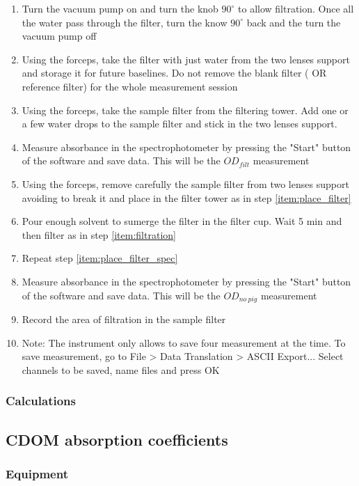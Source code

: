 \begin{appendices}
\begin{enumerate}
  \item \label{item:filtration} Turn the vacuum pump on and turn the knob $90^\circ$ to allow filtration. Once all the water pass through the filter, turn the know $90^\circ$ back and the turn the vacuum pump off
  \item Using the forceps, take the filter with just water from the two lenses support and storage it for future baselines. Do not remove the blank filter ({\color{red} OR reference filter}) for the whole measurement session
  \item \label{item:place_filter_spec} Using the forceps, take the sample filter from the filtering tower. Add one or a few water drops to the sample filter and stick in the two lenses support. 
  \item  Measure absorbance in the spectrophotometer by pressing the "Start" button of the software and save data. This will be the $OD_{filt}$ measurement
  \item Using the forceps, remove carefully the sample filter from two lenses support avoiding to break it and place in the filter tower as in step \ref{item:place_filter}
  \item Pour enough solvent {\color{red} to sumerge} the filter in the filter cup. {\color{red} Wait 5 min} and then filter as in step \ref{item:filtration}
  \item Repeat step \ref{item:place_filter_spec}
  \item Measure absorbance in the spectrophotometer by pressing the "Start" button of the software and save data. This will be the $OD_{no~pig}$ measurement 
  \item Record the area of filtration in the sample filter
  \item[]Note: The instrument only allows to save four measurement at the time. To save measurement, go to File > Data Translation > ASCII Export... {\color{red} Select channels to be saved, name files and press OK}
\end{enumerate}
\subsubsection{Calculations}


\subsection{CDOM absorption coefficients}
\subsubsection{Equipment}

\end{appendices}

